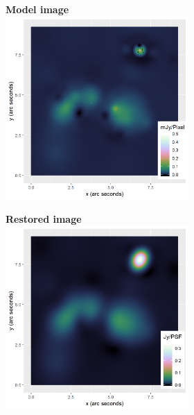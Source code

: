 \begin{figure}[!ht]
	\centering
	\begin{subfigure}[b]{0.82\linewidth}
		\centering
		\begin{subfigure}{0.45\linewidth}
			\centering
			\textbf{Model image}
			\includegraphics[width=1.00\linewidth]{./chapters/10.results/MSClean/Natural-Calibration.png}
		\end{subfigure}
		\begin{subfigure}{0.45\linewidth}
			\centering
			\textbf{Restored image}
			\includegraphics[width=1.00\linewidth]{./chapters/10.results/MSClean/Natural-image-Calibration.png}

\end{subfigure}
\end{subfigure}
\end{figure}
